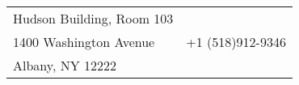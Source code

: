 \documentclass{resume_liang} %
\begin{document}
	
\begin{tabu} to \linewidth {X[l]X[r]}
	Hudson Building, Room 103     &  \href{mailto:lfu@albany.edu}{\color{blue}{lfu@albany.edu}}  \\
	1400 Washington Avenue        & +1 (518)912-9346\\
	Albany, NY 12222              & \href{https://liang-fu-econ.github.io/website/}{\color{blue}{https://liang-fu-econ.github.io/website/}}
\end{tabu}
\bigskip \bigskip









\end{document}
